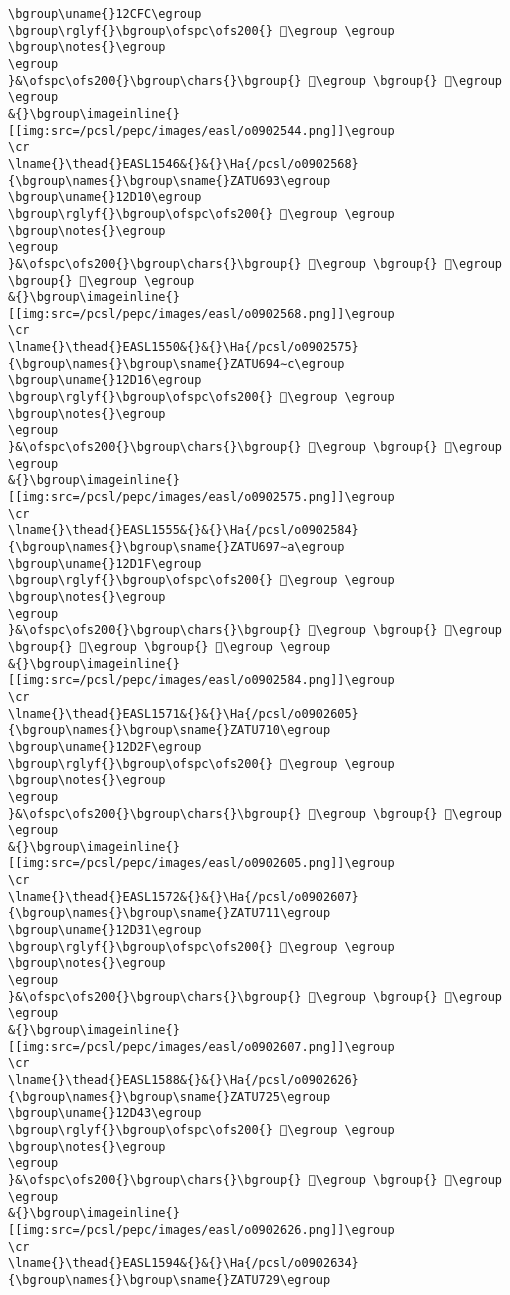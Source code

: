 \begin{verbatim}
\bgroup\uname{}12CFC\egroup
\bgroup\rglyf{}\bgroup\ofspc\ofs200{} 𒳼\egroup \egroup
\bgroup\notes{}\egroup
\egroup
}&\ofspc\ofs200{}\bgroup\chars{}\bgroup{} 𒳻\egroup \bgroup{} 𒳼\egroup \egroup
&{}\bgroup\imageinline{}[[img:src=/pcsl/pepc/images/easl/o0902544.png]]\egroup
\cr
\lname{}\thead{}EASL1546&{}&{}\Ha{/pcsl/o0902568}{\bgroup\names{}\bgroup\sname{}ZATU693\egroup
\bgroup\uname{}12D10\egroup
\bgroup\rglyf{}\bgroup\ofspc\ofs200{} 𒴐\egroup \egroup
\bgroup\notes{}\egroup
\egroup
}&\ofspc\ofs200{}\bgroup\chars{}\bgroup{} 𒴐\egroup \bgroup{} 𒴒\egroup \bgroup{} 𒴓\egroup \egroup
&{}\bgroup\imageinline{}[[img:src=/pcsl/pepc/images/easl/o0902568.png]]\egroup
\cr
\lname{}\thead{}EASL1550&{}&{}\Ha{/pcsl/o0902575}{\bgroup\names{}\bgroup\sname{}ZATU694∼c\egroup
\bgroup\uname{}12D16\egroup
\bgroup\rglyf{}\bgroup\ofspc\ofs200{} 𒴖\egroup \egroup
\bgroup\notes{}\egroup
\egroup
}&\ofspc\ofs200{}\bgroup\chars{}\bgroup{} 𒴖\egroup \bgroup{} 𒴗\egroup \egroup
&{}\bgroup\imageinline{}[[img:src=/pcsl/pepc/images/easl/o0902575.png]]\egroup
\cr
\lname{}\thead{}EASL1555&{}&{}\Ha{/pcsl/o0902584}{\bgroup\names{}\bgroup\sname{}ZATU697∼a\egroup
\bgroup\uname{}12D1F\egroup
\bgroup\rglyf{}\bgroup\ofspc\ofs200{} 𒴟\egroup \egroup
\bgroup\notes{}\egroup
\egroup
}&\ofspc\ofs200{}\bgroup\chars{}\bgroup{} 𒴜\egroup \bgroup{} 𒴝\egroup \bgroup{} 𒴞\egroup \bgroup{} 𒴟\egroup \egroup
&{}\bgroup\imageinline{}[[img:src=/pcsl/pepc/images/easl/o0902584.png]]\egroup
\cr
\lname{}\thead{}EASL1571&{}&{}\Ha{/pcsl/o0902605}{\bgroup\names{}\bgroup\sname{}ZATU710\egroup
\bgroup\uname{}12D2F\egroup
\bgroup\rglyf{}\bgroup\ofspc\ofs200{} 𒴯\egroup \egroup
\bgroup\notes{}\egroup
\egroup
}&\ofspc\ofs200{}\bgroup\chars{}\bgroup{} 𒴯\egroup \bgroup{} 𒴰\egroup \egroup
&{}\bgroup\imageinline{}[[img:src=/pcsl/pepc/images/easl/o0902605.png]]\egroup
\cr
\lname{}\thead{}EASL1572&{}&{}\Ha{/pcsl/o0902607}{\bgroup\names{}\bgroup\sname{}ZATU711\egroup
\bgroup\uname{}12D31\egroup
\bgroup\rglyf{}\bgroup\ofspc\ofs200{} 𒴱\egroup \egroup
\bgroup\notes{}\egroup
\egroup
}&\ofspc\ofs200{}\bgroup\chars{}\bgroup{} 𒴲\egroup \bgroup{} 𒴱\egroup \egroup
&{}\bgroup\imageinline{}[[img:src=/pcsl/pepc/images/easl/o0902607.png]]\egroup
\cr
\lname{}\thead{}EASL1588&{}&{}\Ha{/pcsl/o0902626}{\bgroup\names{}\bgroup\sname{}ZATU725\egroup
\bgroup\uname{}12D43\egroup
\bgroup\rglyf{}\bgroup\ofspc\ofs200{} 𒵃\egroup \egroup
\bgroup\notes{}\egroup
\egroup
}&\ofspc\ofs200{}\bgroup\chars{}\bgroup{} 𒵂\egroup \bgroup{} 𒵃\egroup \egroup
&{}\bgroup\imageinline{}[[img:src=/pcsl/pepc/images/easl/o0902626.png]]\egroup
\cr
\lname{}\thead{}EASL1594&{}&{}\Ha{/pcsl/o0902634}{\bgroup\names{}\bgroup\sname{}ZATU729\egroup

\end{verbatim}
